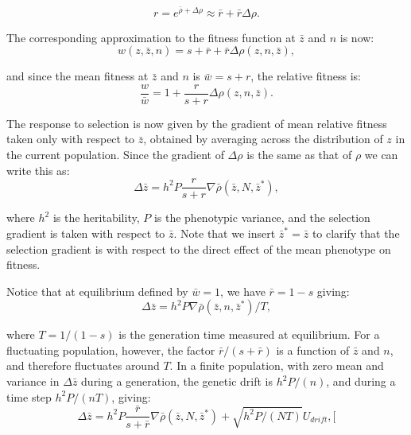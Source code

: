 \documentclass{article}
\begin{document}
		\begin{equation}
		r=e^{\bar{\rho}+\Delta \rho}\approx \bar{r}+\bar{r}\Delta \rho . \tag{A1.4}\label{B34} 
		\end{equation}	
		
		The corresponding approximation to the fitness function at $\bar{z}$ and $n$ is now: 
		\begin{equation}
		w(z,\bar{z},n)=s+\bar{r} + \bar{r} \Delta \rho(z,n, \bar{z}),  \tag{A1.5}\label{B35} 
		\end{equation}
		
		and since the mean fitness at $\bar{z}$ and $n$ is $\bar{w}=s + r$, the relative fitness is: 
		\begin{equation}
		\frac{w}{\bar{w}}=1+\frac{r}{s+r}\Delta \rho(z,n,\bar{z}). \tag{A1.6}\label{B36} 
		\end{equation}
		
		The response to selection is now given by the gradient of mean relative fitness taken only with respect to $\bar{z}$, obtained by averaging across the distribution of $z$ in the current population. Since the gradient of $\Delta \rho$ is the same as that of $\rho$ we can write this as: 
		\begin{equation}
		\Delta \bar{z}=h^2P\frac{r}{s+r}\nabla \bar{\rho}(\bar{z},N,\bar{z}^*), \tag{A1.7}\label{B37} 
		\end{equation}
		
		\noindent where $h^2$ is the heritability, $P$ is the phenotypic variance, and the selection gradient is taken with respect to $\bar{z}$. Note that we insert $\bar{z}^*=\bar{z}$ to clarify that the selection gradient is with respect to the direct effect of the mean phenotype on fitness. 
		
		Notice that at equilibrium defined by $\bar{w}=1$, we have $\bar{r}=1-s$ giving: 
		\begin{equation}
		\Delta \bar{z}=h^2P\nabla \bar{\rho}(\bar{z},n,\bar{z}^*)/T, \tag{A1.8}\label{B38} 
		\end{equation}
		
		\noindent where $T=1/(1-s)$ is the generation time measured at equilibrium. For a fluctuating population, however, the factor $\bar{r}/(s+\bar{r})$ is a function of $\bar{z}$ and $n$, and therefore fluctuates around $T$. 
		In a finite population, with zero mean and variance in $\Delta \bar{z}$ during a generation, the genetic drift is  $h^2P/(n)$, and during a time step $h^2P/(nT)$, giving:
		\begin{equation}
		\Delta \bar{z}=h^2P\frac{\bar{r}}{s+\bar{r}}\nabla \bar{\rho}(\bar{z},N,\bar{z}^*)+\sqrt{h^2P/(NT)}U_{drift}, \tag{A1.9}\label{B39} 
		[\end{equation} 
		
\end{document}
